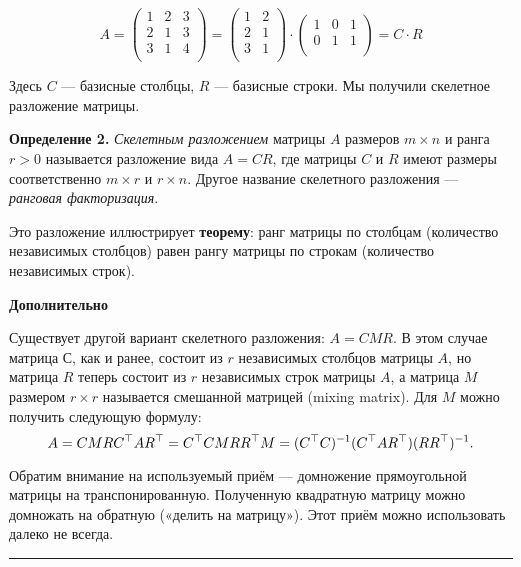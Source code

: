 \documentclass[11pt,a4paper]{article}
\renewcommand{\linethickness}{0.1ex}
\begin{document}
\[
  A = 
  \begin{pmatrix}
     1 & 2 & 3 \\
     2 & 1 & 3 \\
     3 & 1 & 4 \\
  \end{pmatrix}
  =
  \begin{pmatrix}
     1 & 2 \\
     2 & 1 \\
     3 & 1 \\
  \end{pmatrix}
  \cdot
  \begin{pmatrix}
     1 & 0 & 1 \\
     0 & 1 & 1 \\
  \end{pmatrix}
  = C \cdot R
\]

Здесь \(C\) --- базисные столбцы, \(R\) --- базисные строки. Мы получили
скелетное разложение матрицы.

\textbf{Определение 2.} \emph{Скелетным разложением} матрицы \(A\)
размеров \(m \times n\) и ранга \(r>0\) называется разложение вида
\(A = CR\), где матрицы \(C\) и \(R\) имеют размеры соответственно
\(m \times r\) и \(r \times n\). Другое название скелетного разложения
--- \emph{ранговая факторизация}.

Это разложение иллюстрирует \textbf{теорему}: ранг матрицы по столбцам
(количество независимых столбцов) равен рангу матрицы по строкам
(количество независимых строк).

    \textbf{Дополнительно}

Существует другой вариант скелетного разложения: \(A = CMR\). В этом
случае матрица \(С\), как и ранее, состоит из \(r\) независимых столбцов
матрицы \(A\), но матрица \(R\) теперь состоит из \(r\) независимых
строк матрицы \(A\), а матрица \(M\) размером \(r \times r\) называется
смешанной матрицей (mixing matrix). Для \(M\) можно получить следующую
формулу: \[
  A = CMR \\
  C^\top A R^\top = C^\top C M R R^\top \\
  M = (C^\top C)^{-1} (C^\top A R^\top) (R R^\top)^{-1}.
\]

Обратим внимание на используемый приём --- домножение прямоугольной
матрицы на транспонированную. Полученную квадратную матрицу можно
домножать на обратную («делить на матрицу»). Этот приём можно
использовать далеко не всегда.

    \begin{center}\rule{0.5\linewidth}{\linethickness}\end{center}
\end{document}
